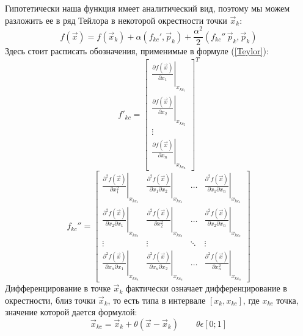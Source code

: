Гипотетически наша функция имеет аналитический вид, поэтому мы можем разложить ее в ряд Тейлора в некоторой окрестности точки $\vec x_k$:
\begin{equation}
    f(\vec x) = f(\vec x_k) + \alpha(f_{kc}',\vec p_k) + \frac{\alpha^2}{2}(f_{kc}'' \, \vec p_k,\vec p_k)
    \label{Teylor}
\end{equation}
Здесь стоит расписать обозначения, применимые в формуле (\ref{Teylor}):
\begin{equation*}
    f'_{kc} = \left[ 
    \begin{array}{c}
         \left.\frac{\partial f(\vec x)}{\partial x_1}\right|_{x_{kc_1}} \\
         \left.\frac{\partial f(\vec x)}{\partial x_2}\right|_{x_{kc_2}} \\
         \vdots \\
         \left.\frac{\partial f(\vec x)}{\partial x_n}\right|_{x_{kc_n}}
         \end{array}
    \right]^T
\end{equation*}
\begin{equation*}
    f_{kc}'' = \left[ 
    \begin{array}{cccc}
         \left.\frac{\partial^2 f(\vec x)}{\partial x_1^2}\right|_{x_{kc_1}} &
         \left.\frac{\partial^2 f(\vec x)}{\partial x_1 \partial x_2}\right|_{x_{kc_1}} &
         \ldots &  \left.\frac{\partial^2 f(\vec x)}{\partial x_1 \partial x_n}\right|_{x_{kc_1}} \\
         \left.\frac{\partial^2 f(\vec x)}{\partial x_2 \partial x_1}\right|_{x_{kc_2}} &
         \left.\frac{\partial^2 f(\vec x)}{\partial x_2^2}\right|_{x_{kc_2}} &
         \ldots &  \left.\frac{\partial^2 f(\vec x)}{\partial x_2 \partial x_n}\right|_{x_{kc_2}} \\
         \vdots & \vdots & \ddots & \vdots \\
         \left.\frac{\partial^2 f(\vec x)}{\partial x_n \partial x_1}\right|_{x_{kc_n}} &
         \left.\frac{\partial^2 f(\vec x)}{\partial x_n \partial x_2}\right|_{x_{kc_n}} &
         \ldots &  \left.\frac{\partial^2 f(\vec x)}{\partial x_n^2}\right|_{x_{kc_n}}
    \end{array}
    \right]
\end{equation*}
Дифференцирование в точке $\vec x_k$ фактически означает дифференцирование в окрестности, близ точки  $\vec x_k$, то есть типа в интервале $[x_k, x_{kc}]$, где $x_{kc}$ точка, значение которой дается формулой:
\begin{equation*}
   \vec x_{kc} =\vec x_k + \theta\left(\vec x - \vec x_k\right) \qquad \theta \epsilon [0; 1]
\end{equation*}


